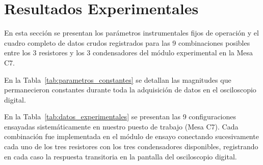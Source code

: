 
\section{Resultados Experimentales}
\label{sec:resultados}

En esta sección se presentan los parámetros instrumentales fijos de operación y el cuadro completo de datos crudos registrados para las 9 combinaciones posibles entre los 3 resistores y los 3 condensadores del módulo experimental en la Mesa C7.

En la Tabla~\ref{tab:parametros_constantes} se detallan las magnitudes que permanecieron constantes durante toda la adquisición de datos en el osciloscopio digital.

\begin{table}[H]
    \centering
    \caption{Parámetros instrumentales constantes de la excitación periódica.}
    \label{tab:parametros_constantes}
\end{table}

En la Tabla~\ref{tab:datos_experimentales} se presentan las 9 configuraciones ensayadas sistemáticamente en nuestro puesto de trabajo (Mesa C7). Cada combinación fue implementada en el módulo de ensayo conectando sucesivamente cada uno de los tres resistores con los tres condensadores disponibles, registrando en cada caso la respuesta transitoria en la pantalla del osciloscopio digital.

